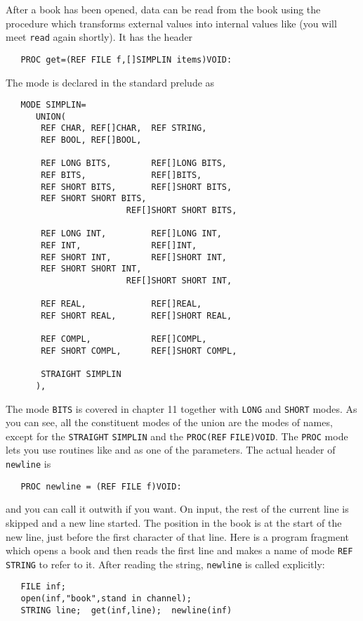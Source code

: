 After a book has been opened, data can be read from the book using
the procedure  which transforms external values into
internal values like  (you will meet \verb|read| again
shortly). It has the header
\begin{verbatim}
   PROC get=(REF FILE f,[]SIMPLIN items)VOID:
\end{verbatim}
\noindent
The mode  is declared in the standard prelude as
\begin{verbatim}
   MODE SIMPLIN=
      UNION(
       REF CHAR, REF[]CHAR,  REF STRING,
       REF BOOL, REF[]BOOL,
   
       REF LONG BITS,        REF[]LONG BITS,
       REF BITS,             REF[]BITS,
       REF SHORT BITS,       REF[]SHORT BITS,
       REF SHORT SHORT BITS,
                        REF[]SHORT SHORT BITS,
   
       REF LONG INT,         REF[]LONG INT,
       REF INT,              REF[]INT,
       REF SHORT INT,        REF[]SHORT INT,
       REF SHORT SHORT INT,
                        REF[]SHORT SHORT INT,
   
       REF REAL,             REF[]REAL,
       REF SHORT REAL,       REF[]SHORT REAL,
   
       REF COMPL,            REF[]COMPL,
       REF SHORT COMPL,      REF[]SHORT COMPL,
            
       STRAIGHT SIMPLIN
      ),
\end{verbatim}
\noindent
The mode \verb|BITS| is covered in chapter 11 together with
\verb|LONG| and \verb|SHORT| modes. As you can see, all the
constituent modes of the union are the modes of names, except for the
\verb|STRAIGHT| \verb|SIMPLIN| and the \verb|PROC(REF|
\verb|FILE)VOID|. The \verb|PROC| mode lets you use routines like
 and  as one of the parameters. The
actual header of \verb|newline| is
\begin{verbatim}
   PROC newline = (REF FILE f)VOID:
\end{verbatim}
\noindent
and you can call it outwith  if you want.
On input, the rest of the current line is skipped and a new line
started. The position in the book is at the start of the new line, just
before the first character of that line. Here is a program fragment
which opens a book and then reads the first line and makes a name of
mode \verb|REF STRING| to refer to it. After reading the string,
\verb|newline| is called explicitly:
\begin{verbatim}
   FILE inf;
   open(inf,"book",stand in channel);
   STRING line;  get(inf,line);  newline(inf)
\end{verbatim}
